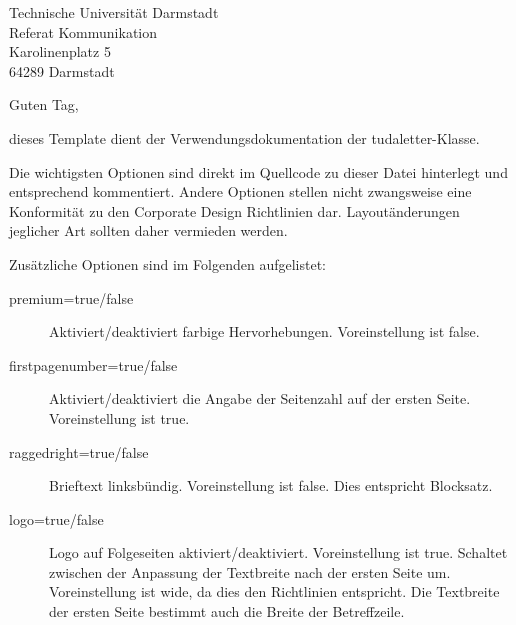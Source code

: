 \documentclass[
	german,%
	accentcolor=9c,%
	premium=true,%
]{tudaletter}
\begin{document}
\begin{letter}{%
	Technische Universität Darmstadt\\%
	Referat Kommunikation\\%
	Karolinenplatz 5\\%
	64289 Darmstadt}


\opening{Guten Tag,}
dieses Template dient der Verwendungsdokumentation der tudaletter-Klasse.

Die wichtigsten Optionen sind direkt im Quellcode zu dieser Datei hinterlegt und entsprechend kommentiert.
Andere Optionen stellen nicht zwangsweise eine Konformität zu den Corporate Design Richtlinien dar.
Layoutänderungen jeglicher Art sollten daher vermieden werden.

Zusätzliche Optionen sind im Folgenden aufgelistet:\\
\parbox{\linewidth}{
	\begin{description}
		\item[premium=true/false] Aktiviert/deaktiviert farbige Hervorhebungen. Voreinstellung ist false.
		\item[firstpagenumber=true/false] Aktiviert/deaktiviert die Angabe der Seitenzahl auf der ersten Seite. Voreinstellung ist true.
		\item[raggedright=true/false] Brieftext linksbündig. Voreinstellung ist false. Dies entspricht Blocksatz.
		\item[logo=true/false] Logo auf Folgeseiten aktiviert/deaktiviert. Voreinstellung ist true.
		      Schaltet zwischen der Anpassung der Textbreite nach der ersten Seite um. Voreinstellung ist wide, da dies den Richtlinien entspricht. Die Textbreite der ersten Seite bestimmt auch die Breite der Betreffzeile.
	\end{description}
}


\end{letter}
\end{document}
